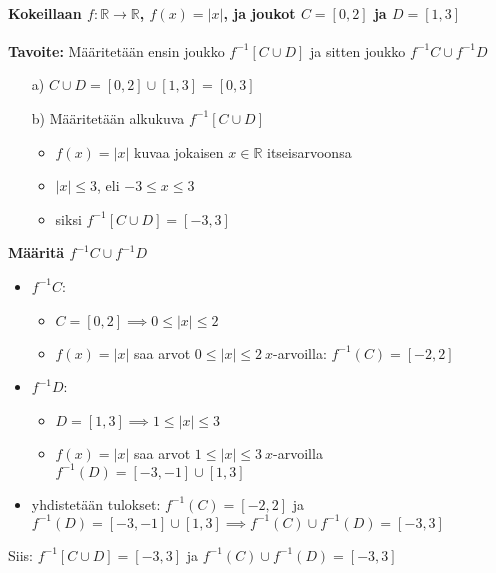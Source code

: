 \documentclass{article}
\begin{document}
    \paragraph*{Kokeillaan $f : \mathbb{R} \to \mathbb{R}$, $f(x) = |x|$, ja joukot $C = [0, 2]$ ja $D = [1, 3]$}\quad\newline
    \textbf{Tavoite:} Määritetään ensin joukko $f^{-1}[C \cup D]$ ja sitten joukko $f^{-1}C \cup f^{-1}D$
    \begin{itemize}
        \item[a)] $C \cup D = [0, 2] \cup [1, 3] = [0, 3]$
        \item[b)] Määritetään alkukuva $f^{-1}[C \cup D]$
        \begin{itemize}
            \item $f(x) = |x|$ kuvaa jokaisen $x \in \mathbb{R}$ itseisarvoonsa
            \item $|x| \leq 3$, eli $-3 \leq x \leq 3$
            \item siksi $f^{-1}[C \cup D] = [-3, 3]$
        \end{itemize}
    \end{itemize}
    \quad\newline
    \textbf{Määritä $f^{-1}C \cup f^{-1}D$}
    \begin{itemize}
        \item $f^{-1}C$:
        \begin{itemize}
            \item $C = [0, 2] \implies 0 \leq |x| \leq 2$
            \item $f(x) = |x|$ saa arvot $0 \leq |x| \leq 2 \ x$-arvoilla: $f^{-1}(C) = [-2, 2]$
        \end{itemize} 
        \item $f^{-1}D$:
        \begin{itemize}
            \item $D = [1, 3] \implies 1 \leq |x| \leq 3$
            \item $f(x) = |x|$ saa arvot $1 \leq |x| \leq 3 \ x$-arvoilla $f^{-1}(D) = [-3, -1] \cup [1, 3]$
        \end{itemize} 
        \item yhdistetään tulokset: $f^{-1}(C) = [-2, 2]$ ja $f^{-1}(D) = [-3, -1] \cup [1, 3] \implies 
        f^{-1}(C) \cup f^{-1}(D) = [-3, 3]$
    \end{itemize}
    \quad\newline
    Siis: $f^{-1}[C \cup D] = [-3, 3]$ ja $f^{-1}(C) \cup f^{-1}(D) = [-3, 3]$
\end{document}
